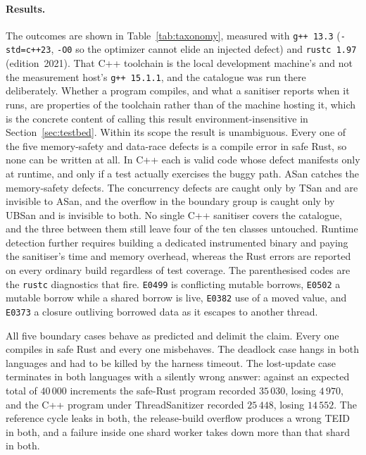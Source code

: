 \documentclass[english,twoside,openright,a4paper,censored,csm,software-track-2020]{HYthesisML}
\begin{document}
\paragraph{Results.}
The outcomes are shown in Table~\ref{tab:taxonomy}, measured with \texttt{g++~13.3}
(\texttt{-std=c++23}, \texttt{-O0} so the optimizer cannot elide an injected defect) and
\texttt{rustc~1.97} (edition~2021). That C++ toolchain is the local development machine's
and not the measurement host's \texttt{g++~15.1.1}, and the catalogue was run there
deliberately. Whether a program compiles, and what a sanitiser reports when it runs, are
properties of the toolchain rather than of the machine hosting it, which is the concrete
content of calling this result environment-insensitive in
Section~\ref{sec:testbed}. Within its scope the result is unambiguous. Every one of
the five memory-safety and data-race defects is a compile error in safe Rust, so none can be
written at all. In C++ each is valid code whose defect manifests only at runtime, and
only if a test actually exercises the buggy path. ASan catches the memory-safety defects. The
concurrency defects are caught only by TSan and are invisible to ASan, and the overflow in the
boundary group is caught only by UBSan and is invisible to both. No single C++ sanitiser covers
the catalogue, and the three between them still leave four of the ten classes untouched.
Runtime detection further requires building a
dedicated instrumented binary and paying the sanitiser's time and memory overhead, whereas the
Rust errors are reported on every ordinary build regardless of test coverage. The parenthesised
codes are the \texttt{rustc} diagnostics that fire. \texttt{E0499} is conflicting mutable
borrows, \texttt{E0502} a mutable borrow while a shared borrow is live, \texttt{E0382} use of a
moved value, and \texttt{E0373} a closure outliving borrowed data as it escapes to another
thread.

All five boundary cases behave as predicted and delimit the claim. Every one compiles in safe
Rust and every one misbehaves. The deadlock case hangs in both languages and had to be killed
by the harness timeout. The lost-update case terminates in both languages with a silently wrong
answer: against an expected total of $40\,000$ increments the safe-Rust program recorded
$35\,030$, losing $4\,970$, and the C++ program under ThreadSanitizer recorded $25\,448$,
losing $14\,552$. The reference cycle leaks in both, the release-build overflow produces a
wrong TEID in both, and a failure inside one shard worker takes down more than that shard in
both.
\end{document}
